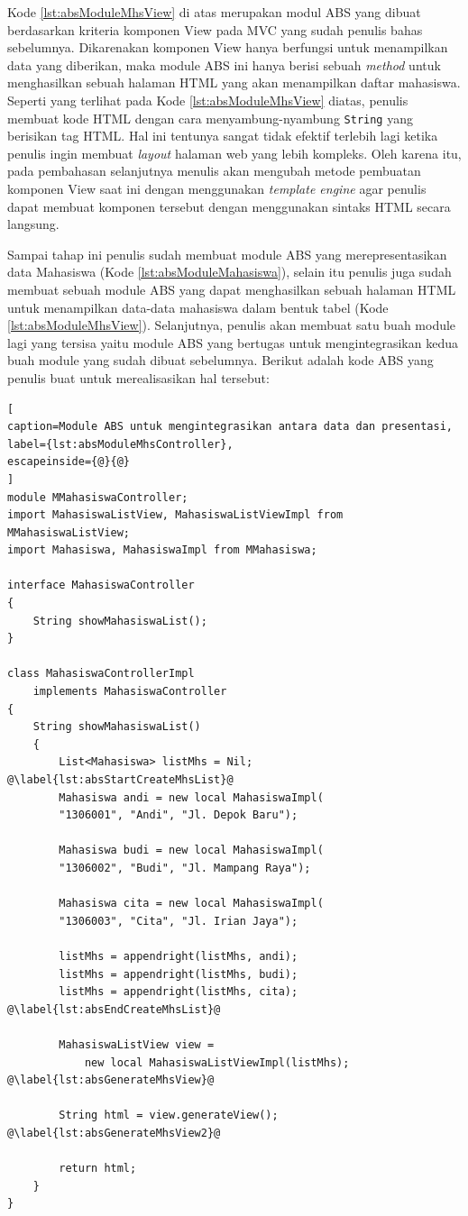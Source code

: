 Kode \ref{lst:absModuleMhsView} di atas merupakan modul ABS yang dibuat berdasarkan kriteria komponen View pada MVC yang sudah penulis bahas sebelumnya. Dikarenakan komponen View hanya berfungsi untuk menampilkan data yang diberikan, maka module ABS ini hanya berisi sebuah \textit{method} untuk menghasilkan sebuah halaman HTML yang akan menampilkan daftar mahasiswa. Seperti yang terlihat pada Kode \ref{lst:absModuleMhsView} diatas, penulis membuat kode HTML dengan cara menyambung-nyambung \texttt{String} yang berisikan tag HTML. Hal ini tentunya sangat tidak efektif terlebih lagi ketika penulis ingin membuat \textit{layout} halaman web yang lebih kompleks. Oleh karena itu, pada pembahasan selanjutnya menulis akan mengubah metode pembuatan komponen View saat ini dengan menggunakan \textit{template engine} agar penulis dapat membuat komponen tersebut dengan menggunakan sintaks HTML secara langsung.

Sampai tahap ini penulis sudah membuat module ABS yang merepresentasikan data Mahasiswa (Kode \ref{lst:absModuleMahasiswa}), selain itu penulis juga sudah membuat sebuah module ABS yang dapat menghasilkan sebuah halaman HTML untuk menampilkan data-data mahasiswa dalam bentuk tabel (Kode \ref{lst:absModuleMhsView}). Selanjutnya, penulis akan membuat satu buah module lagi yang tersisa yaitu module ABS yang bertugas untuk mengintegrasikan kedua buah module yang sudah dibuat sebelumnya. Berikut adalah kode ABS yang penulis buat untuk merealisasikan hal tersebut:

\begin{lstlisting}[
caption=Module ABS untuk mengintegrasikan antara data dan presentasi,
label={lst:absModuleMhsController},
escapeinside={@}{@}
]
module MMahasiswaController;
import MahasiswaListView, MahasiswaListViewImpl from MMahasiswaListView;
import Mahasiswa, MahasiswaImpl from MMahasiswa;

interface MahasiswaController
{
	String showMahasiswaList();
}

class MahasiswaControllerImpl 
	implements MahasiswaController
{
	String showMahasiswaList()
	{
		List<Mahasiswa> listMhs = Nil; @\label{lst:absStartCreateMhsList}@
		Mahasiswa andi = new local MahasiswaImpl(
		"1306001", "Andi", "Jl. Depok Baru");
		
		Mahasiswa budi = new local MahasiswaImpl(
		"1306002", "Budi", "Jl. Mampang Raya");
		
		Mahasiswa cita = new local MahasiswaImpl(
		"1306003", "Cita", "Jl. Irian Jaya");
		
		listMhs = appendright(listMhs, andi);
		listMhs = appendright(listMhs, budi);
		listMhs = appendright(listMhs, cita); @\label{lst:absEndCreateMhsList}@
		
		MahasiswaListView view = 
			new local MahasiswaListViewImpl(listMhs); @\label{lst:absGenerateMhsView}@
		
		String html = view.generateView(); @\label{lst:absGenerateMhsView2}@
		
		return html;
	}
}
\end{lstlisting}

